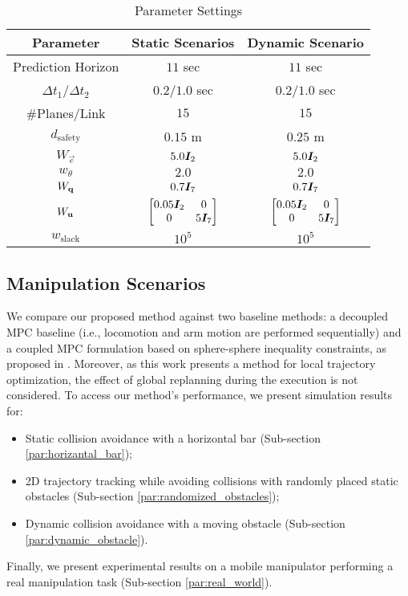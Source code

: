 \begin{table}[ht]
  \centering
  \caption{Parameter Settings}
  \label{tab:parameters}
  \begin{tabular}{|c|c|c|}
  \hline
  Parameter & Static Scenarios & Dynamic Scenario\\
  \hline
  Prediction Horizon & $11$ sec & $11$ sec\\
  \hline
  $\Delta t_1$/$\Delta t_2$ & $0.2$/$1.0$ sec & $0.2$/$1.0$ sec\\
  \hline
  \#Planes/Link & $15$ & $15$ \\
  \hline
  $d_{\textrm{safety}}$ & $0.15$ m & $0.25$ m \\
  \hline
  $W_{\vec{e}}$ & $5.0\bm{I}_2$ & $5.0\bm{I}_2$\\
  \hline
  $w_{\theta}$ & $2.0$ & $2.0$\\
  \hline
  $W_{\mathbf{q}}$ & $0.7 \bm{I}_7$ & $0.7 \bm{I}_7$ \\
  \hline
  $W_{\mathbf{u}}$ & $\begin{bmatrix} 0.05\bm{I}_2 & 0 \\ 0 & 5\bm{I}_7 \end{bmatrix}$ &
  $\begin{bmatrix} 0.05\bm{I}_2 & 0 \\ 0 & 5\bm{I}_7 \end{bmatrix}$ \\
  \hline
  $w_{\textrm{slack}}$ & $10^{5}$ & $10^{5}$\\
  \hline
  \end{tabular}
\end{table}
%
%
\subsection{Manipulation Scenarios}%
\label{sub:environment_setup}

We compare our proposed method against two baseline methods: a decoupled MPC baseline (i.e., locomotion and arm motion are performed sequentially) and a coupled MPC formulation based on sphere-sphere inequality constraints, as proposed in \cite{Avanzini2018}. Moreover, as this work presents a method for local trajectory optimization, the effect of global replanning during the execution is not considered. To access our method's performance, we present simulation results for:
\begin{itemize}
    \item Static collision avoidance with a horizontal bar \cite{Avanzini2018} (Sub-section \ref{par:horizantal_bar});
    \item 2D trajectory tracking while avoiding collisions with randomly placed static obstacles (Sub-section \ref{par:randomized_obstacles});
    \item Dynamic collision avoidance with a moving obstacle (Sub-section \ref{par:dynamic_obstacle}).
\end{itemize} 
Finally, we present experimental results on a mobile manipulator performing a real manipulation task (Sub-section \ref{par:real_world}).

